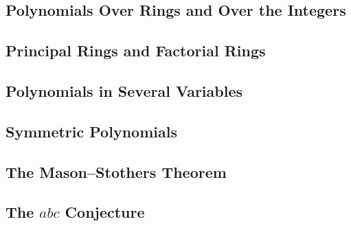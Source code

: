 \subsection{Polynomials Over Rings and Over the Integers}

\subsection{Principal Rings and Factorial Rings}

\subsection{Polynomials in Several Variables}

\subsection{Symmetric Polynomials}

\subsection{The Mason--Stothers Theorem}

\subsection{The $abc$ Conjecture}

\begin{comment}

Let $R$ be a commutative ring with $1$. Let $x$ be a formal variable. We define the \vocab{polynomial ring} $R[x]$ as
\[R[x]=\{a_nx^n+\cdots+a_1x+a_0\mid a_i\in R\}.\]
Addition works as follows:
\[f(x)=\sum_{k=0}^{n}a_kx^k, g(x)=\sum_{j=0}^{m}b_jx^j,\quad f(x)+g(x)=\sum_{i=0}^{\max\{n,m\}}(a_i+b_i)x^i.\]
Multiplication works as follows:
\[f(x)g(x)=\sum_{k=0}^{m+n}\brac{\sum_{i=0}^{k}a_ib_{k-i}}x^k.\]

\begin{lemma}
Let $R$ be an integral domain. Then $R[x]$ is also an integral domain.
\end{lemma}

\begin{definition}
Let $R\subset R[x]$ be a subring, $f(x)\in R[x]$, $f(x)=a_nx^n+\cdots+a_1x+a_0$.
\begin{itemize}
\item If $a_n\neq0$, then $\deg f\colonequals n$.
\item If $a_n=1$, then $f$ is a \emph{monic polynomial}.
\item If $R$ is an integral domain, then $f(x)g(x)\in R[x]\setminus\{0\}$, $\deg fg=\deg f+\deg g$.
\end{itemize}
\end{definition}

\begin{remark}
For general commutative rings, $\deg fg\le \deg f+\deg g$.
\end{remark}
\end{comment}

